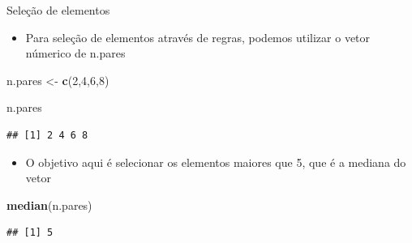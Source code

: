 \documentclass[
  10pt,
  ignorenonframetext,
]{beamer}
\newenvironment{Shaded}{\begin{snugshade}}{\end{snugshade}}
\newcommand{\DecValTok}[1]{\textcolor[rgb]{0.00,0.00,0.81}{#1}}
\newcommand{\KeywordTok}[1]{\textcolor[rgb]{0.13,0.29,0.53}{\textbf{#1}}}
\newcommand{\NormalTok}[1]{#1}
\newcommand{\StringTok}[1]{\textcolor[rgb]{0.31,0.60,0.02}{#1}}
\providecommand{\tightlist}{%
  \setlength{\itemsep}{0pt}\setlength{\parskip}{0pt}}
\begin{document}
\begin{frame}[fragile]{Seleção de elementos}
\protect\hypertarget{seleuxe7uxe3o-de-elementos-5}{}
\begin{itemize}
\tightlist
\item
  Para seleção de elementos através de regras, podemos utilizar o vetor
  númerico de n.pares
\end{itemize}

\begin{Shaded}
\begin{Highlighting}[]
\NormalTok{n.pares  \textless{}{-}}\StringTok{ }\KeywordTok{c}\NormalTok{(}\DecValTok{2}\NormalTok{,}\DecValTok{4}\NormalTok{,}\DecValTok{6}\NormalTok{,}\DecValTok{8}\NormalTok{)}

\NormalTok{n.pares}
\end{Highlighting}
\end{Shaded}

\begin{verbatim}
## [1] 2 4 6 8
\end{verbatim}

\begin{itemize}
\tightlist
\item
  O objetivo aqui é selecionar os elementos maiores que 5, que é a
  mediana do vetor
\end{itemize}

\begin{Shaded}
\begin{Highlighting}[]
\KeywordTok{median}\NormalTok{(n.pares)}
\end{Highlighting}
\end{Shaded}

\begin{verbatim}
## [1] 5
\end{verbatim}
\end{frame}
\end{document}
